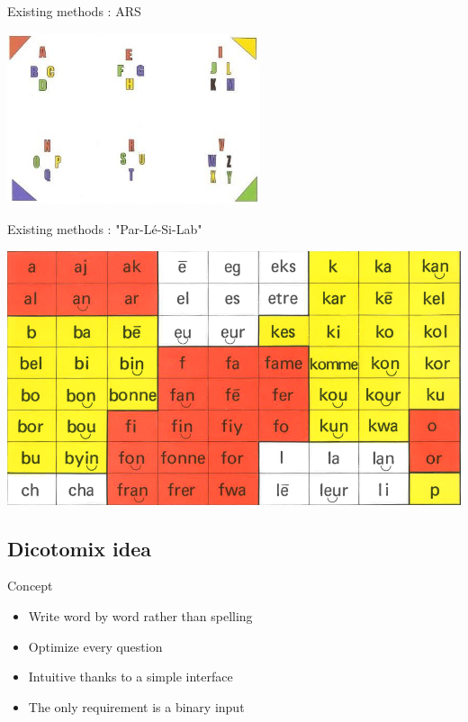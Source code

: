 \documentclass[notes]{beamer}
\begin{document}
\begin{frame}{Existing methods : ARS}
	\begin{center}
		\includegraphics[scale=0.9]{tableau_lettres_transparent}
	\end{center}
\end{frame}

\begin{frame}{Existing methods : "Par-Lé-Si-Lab"}
	\begin{center}
		\includegraphics[scale=0.3]{parler_syllabes}
	\end{center}
\end{frame}

\subsection{Dicotomix idea}
\begin{frame}{Concept}
	\begin{center}
		\begin{itemize}
			\item Write word by word rather than spelling
			\item Optimize every question
			\item Intuitive thanks to a simple interface
			\item The only requirement is a binary input
		\end{itemize}
	\end{center}
\end{frame}
\end{document}
